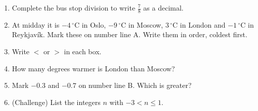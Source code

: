 \documentclass{beamer}
\newcommand{\ashow}[1]{\uncover<2->{\textcolor{red}{\small #1}}}
\newcommand{\abox}[1]{%
  \tikz[baseline=(b.base)]\node[draw=gray, densely dotted, inner sep=1.5pt] (b)
    {\alt<2->{\textcolor{red}{#1}}{\phantom{#1}}};%
}
\newcommand{\tightlist}{%
  \setlength{\itemsep}{0pt}\setlength{\parskip}{0pt}\setlength{\topsep}{0pt}%
}
\newcommand{\dC}[1]{$#1\,^{\circ}$C}
\begin{document}
\begin{frame}
\begin{columns}[T,onlytextwidth]
\vspace{-1.5em}
\footnotesize
\begin{enumerate}\tightlist
{}
  \item Complete the bus stop division to write $\frac78$ as a decimal.
        \ashow{$0.875$}
  \item At midday it is \dC{-4} in Oslo, \dC{-9} in Moscow, \dC{3} in London and
        \dC{-1} in Reykjavík. Mark these on number line A. Write them in order,
        coldest first.
        \ashow{$-9$, \; $-4$, \; $-1$, \; $3$}
  \item[] Write $<$ or $>$ in each box.
{\setlength{\columnsep}{14pt}%
}
  \item How many degrees warmer is London than Moscow?
        \ashow{$12$ degrees}
  \item Mark $-0.3$ and $-0.7$ on number line B. Which is greater?
        \ashow{$-0.3$, because it is further right}
  \item (Challenge) List the integers $n$ with $-3<n\leq1$.
        \ashow{$-2,\ -1,\ 0,\ 1$}
\end{enumerate}
\end{columns}
\end{frame}
\end{document}
